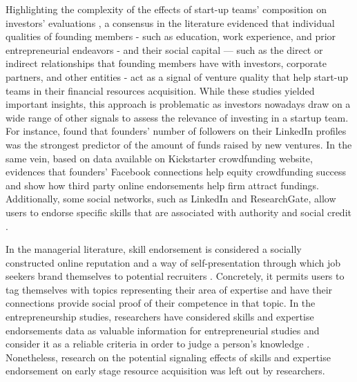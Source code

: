 \documentclass[12pt]{article}
\begin{document}
Highlighting the complexity of the effects of start-up teams' composition on investors’ evaluations \citep{ghassemiautomated}, a consensus in the literature evidenced that individual qualities of founding members - such as education, work experience, and prior entrepreneurial endeavors \citep{shane2002network, hsu2007experienced} - and their social capital — such as the direct or indirect relationships that founding members have with investors, corporate partners, and other entities \citep{shane2002network, hsu2007experienced, huang2017resources} - act as a signal of venture quality that help start-up teams in their financial resources acquisition. While these studies yielded important insights, this approach is problematic as investors nowadays draw on a wide range of other signals to assess the relevance of investing in a startup team. For instance, \citet{banerji2019startup} found that founders' number of followers on their LinkedIn profiles was the strongest predictor of the amount of funds raised by new ventures. In the same vein, based on data available on Kickstarter crowdfunding website, \citet{mollick2014dynamics} evidences that founders' Facebook connections help equity crowdfunding success and \citet{courtney2017resolving} show how third party online endorsements help firm attract fundings. Additionally, some social networks, such as LinkedIn and ResearchGate, allow users to endorse specific skills that are associated with authority and social credit \citep{perez2016endorsement, wu2018analysis}.

In the managerial literature, skill endorsement is considered a socially constructed online reputation and a way of self-presentation through which job seekers brand themselves to potential recruiters \citep{rapanta2017linkedin}. Concretely, it permits users to tag themselves with topics representing their area of expertise and have their connections provide social proof of their competence in that topic. In the entrepreneurship studies, researchers have considered skills and expertise endorsements data as valuable information for entrepreneurial studies and consider it as a reliable criteria in order to judge a person’s knowledge \citep{reese2020should, sako2020scaling}. Nonetheless, research on the potential signaling effects of skills and expertise endorsement on early stage resource acquisition was left out by researchers.
\end{document}
